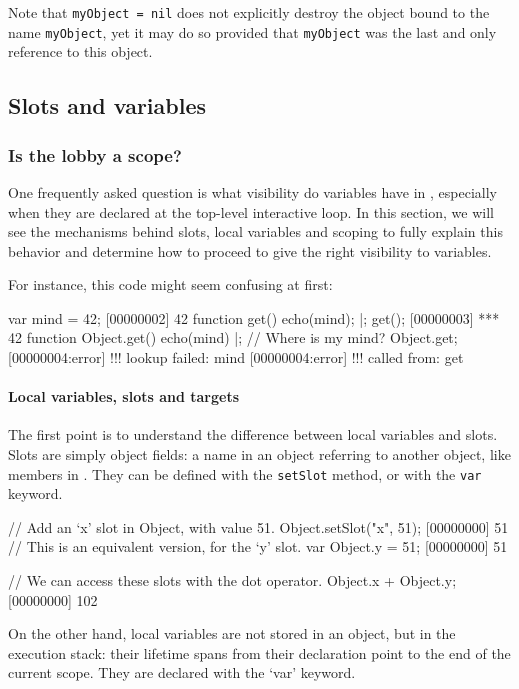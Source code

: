 Note that \lstinline{myObject = nil} does not explicitly destroy the
object bound to the name \lstinline{myObject}, yet it may do
so provided that \lstinline{myObject} was the last and only reference
to this object.

\subsection{Slots and variables}

\subsubsection{Is the lobby a scope?}

One frequently asked question is what visibility do variables have in
\us, especially when they are declared at the top-level interactive
loop.  In this section, we will see the mechanisms behind slots, local
variables and scoping to fully explain this behavior and determine how
to proceed to give the right visibility to variables.

For instance, this code might seem confusing at first:

\begin{urbiscript}
var mind = 42;
[00000002] 42
function get()
{
  echo(mind);
}|;
get();
[00000003] *** 42
function Object.get()
{
  echo(mind)
}|;
// Where is my mind?
Object.get;
[00000004:error] !!! lookup failed: mind
[00000004:error] !!!    called from: get
\end{urbiscript}

\paragraph{Local variables, slots and targets}
The first point is to understand the difference between local
variables and slots. Slots are simply object fields: a name in an
object referring to another object, like members in \Cxx. They can be
defined with the \lstinline|setSlot| method, or with the
\lstinline|var| keyword.

\begin{urbiscript}
// Add an `x' slot in Object, with value 51.
Object.setSlot("x", 51);
[00000000] 51
// This is an equivalent version, for the `y' slot.
var Object.y = 51;
[00000000] 51

// We can access these slots with the dot operator.
Object.x + Object.y;
[00000000] 102
\end{urbiscript}

On the other hand, local variables are not stored in an object, but in
the execution stack: their lifetime spans from their declaration point
to the end of the current scope. They are declared with the `var'
keyword.

